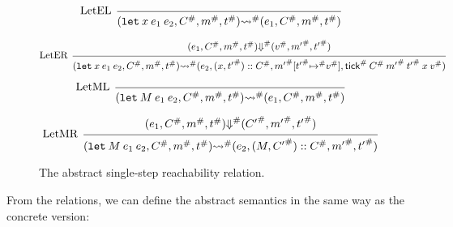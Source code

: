 \documentclass[acmsmall,review]{acmart}\settopmatter{printfolios=true,printccs=false,printacmref=false}
\theoremstyle{definition}
\newcommand*{\cons}{::}
\newcommand*{\A}[1]{{#1}^{\#}}
\newcommand*{\mem}{m}
\newcommand*{\tick}{\mathsf{tick}}
\begin{document}
\begin{figure}[h!]
  \[
    \begin{prooftree}
      \infer[left label=LetEL]0{
      (\mathtt{let}\:x\:e_1\:e_2, \A{C}, \A{\mem}, \A{t})
      \A\rightsquigarrow
      (e_{1}, \A{C}, \A{\mem}, \A{t})
      }
    \end{prooftree}
  \]

  \[
    \begin{prooftree}
      \hypo{
        \begin{matrix}
          (e_{1}, \A{C}, \A{\mem}, \A{t})
          \A\Downarrow
          (\A{v}, \A{\mem'}, \A{t'})
        \end{matrix}
      }
      \infer[left label=LetER]1{
      (\mathtt{let}\:x\:e_1\:e_2, \A{C}, \A{\mem}, \A{t})
      \A\rightsquigarrow
      (e_{2}, (x, \A{t'})\cons\A{C}, \A{\mem'}[\A{t'}\A{\mapsto} \A{v}], \A{\tick}\:\A{C}\:\A{\mem'}\:\A{t'}\:x\:\A{v})
      }
    \end{prooftree}
  \]

  \[
    \begin{prooftree}
      \infer[left label=LetML]0{
      (\mathtt{let}\:M\:e_{1}\:e_{2}, \A{C}, \A{\mem}, \A{t})
      \A\rightsquigarrow
      (e_{1}, \A{C}, \A{\mem}, \A{t})
      }
    \end{prooftree}
  \]

  \[
    \begin{prooftree}
      \hypo{
        \begin{matrix}
          (e_{1}, \A{C}, \A{\mem}, \A{t})
          \A\Downarrow
          (\A{C'}, \A{\mem'}, \A{t'})
        \end{matrix}
      }
      \infer[left label=LetMR]1{
      (\mathtt{let}\:M\:e_{1}\:e_{2}, \A{C}, \A{\mem}, \A{t})
      \A\rightsquigarrow
      (e_{2}, (M,\A{C'})\cons\A{C}, \A{\mem'}, \A{t'})
      }
    \end{prooftree}
  \]
  \caption{The abstract single-step reachability relation.}
  \label{fig:absreach}
\end{figure}

From the relations, we can define the abstract semantics in the same way as the concrete version:
\end{document}
